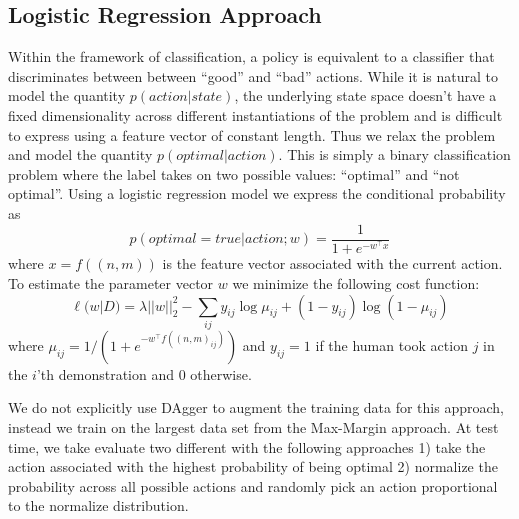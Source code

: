 \subsection{Logistic Regression Approach}
Within the framework of classification, a policy is equivalent to a classifier that discriminates between between “good” and “bad” actions. While it is natural to model the quantity $p(action|state)$, the underlying state space doesn't have a fixed dimensionality across different instantiations of the problem and is difficult to express using a feature vector of constant length. Thus we relax the problem and model the quantity $p(optimal|action)$. This is simply a binary classification problem where the label takes on two possible values: ``optimal'' and ``not optimal''. Using a logistic regression model we express the conditional probability as $$p(optimal=true|action;w) = \frac{1}{1+e^{-w^\top x}}$$ where $x = f((n,m))$ is the feature vector associated with the current action. To estimate the parameter vector $w$ we minimize the following cost function: $$\ell(w|D)=\lambda||w||^2_2-\sum_{ij} y_{ij}\log\mu_{ij}+(1-y_{ij})\log(1-\mu_{ij})$$ where $\mu_{ij}=1/(1+e^{-w^\top f((n,m)_{ij})})$ and $y_{ij}=1$ if the human took action $j$ in the $i$'th demonstration and $0$ otherwise.

We do not explicitly use DAgger to augment the training data for this approach, instead we train on the largest data set from the Max-Margin approach. At test time, we take evaluate two different with the following approaches 1) take the action associated with the highest probability of being optimal 2) normalize the probability across all possible actions and randomly pick an action proportional to the normalize distribution.






